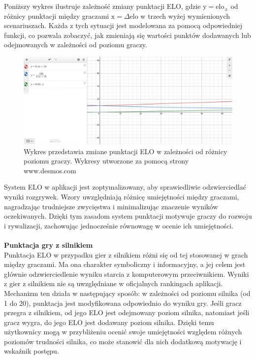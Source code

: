\documentclass[12pt,a4paper]{article}
\begin{document}
\newpage

\noindent
Poniższy wykres ilustruje zależność zmiany punktacji ELO, gdzie $ \text{y} = \text{elo}_{\pm} $ od różnicy punktacji między graczami $ \text{x} = \Delta \text{elo} $  w trzech wyżej wymienionych scenariuszach. Każda z tych sytuacji jest modelowana za pomocą odpowiedniej funkcji, co pozwala zobaczyć, jak zmieniają się wartości punktów dodawanych lub odejmowanych w zależności od poziomu graczy.

\vspace{0.5cm}
\begin{figure}[h!]
    \centering
    \includegraphics[width=1\textwidth]{images/graf_elo_calc.png}
    \caption{Wykres przedstawia zmiane punktacji ELO w zależności od różnicy poziomu graczy. Wykresy utworzone za pomocą strony www.desmos.com}
\end{figure}
\vspace{0.5cm}

\noindent
System ELO w aplikacji jest zoptymalizowany, aby sprawiedliwie odzwierciedlać wyniki rozgrywek. Wzory uwzględniają różnicę umiejętności między graczami, nagradzając trudniejsze zwycięstwa i minimalizując znaczenie wyników oczekiwanych. Dzięki tym zasadom system punktacji motywuje graczy do rozwoju i rywalizacji, zachowując jednocześnie równowagę w ocenie ich umiejętności.
\\\\

\noindent \textbf{Punktacja gry z silnikiem}\\
Punktacja ELO w przypadku gier z silnikiem różni się od tej stosowanej w grach między graczami. Ma ona charakter symboliczny i informacyjny, a jej celem jest głównie odzwierciedlenie wyniku starcia z komputerowym przeciwnikiem. Wyniki z gier z silnikiem nie są uwzględniane w oficjalnych rankingach aplikacji. Mechanizm ten działa w następujący sposób: w zależności od poziomu silnika (od 1 do 20), punktacja jest modyfikowana odpowiednio do wyniku gry. Jeśli gracz przegra z silnikiem, od jego ELO jest odejmowany poziom silnika, natomiast jeśli gracz wygra, do jego ELO jest dodawany poziom silnika. Dzięki temu użytkownicy mogą w przybliżeniu ocenić swoje umiejętności względem różnych poziomów trudności silnika, co może stanowić dla nich dodatkową motywację i wskaźnik postępu.
\end{document}
